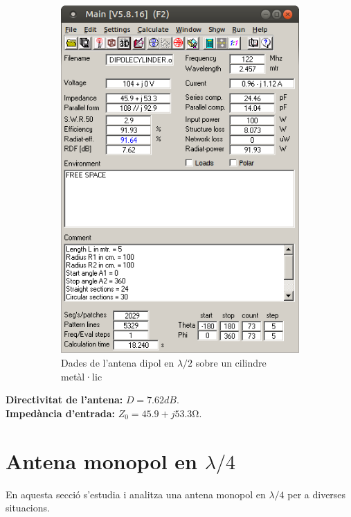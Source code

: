 \begin{figure}[H]
\begin{subfigure}[b]{0.32\textwidth}
	  \includegraphics[width=\textwidth]{./images/3.Dypole_cylinder/3_menu.png}
	  \caption{Dades de l'antena dipol en $\lambda/2$ sobre un cilindre metàl·lic}
	  \label{1menu}
	  \end{subfigure}
	  \vspace{10pt}
	\caption{}
	\label{diag2}
	\end{figure}

	\textbf{Directivitat de l'antena:} $ D=7.62 dB$. \\
	\textbf{Impedància d'entrada:} $ Z_0=45.9+j53.3 \si{\ohm}$.


 \section{Antena monopol en $\lambda/4$}

 En aquesta secció s'estudia i analitza una antena monopol en $\lambda/4$ per a diverses situacions. 

